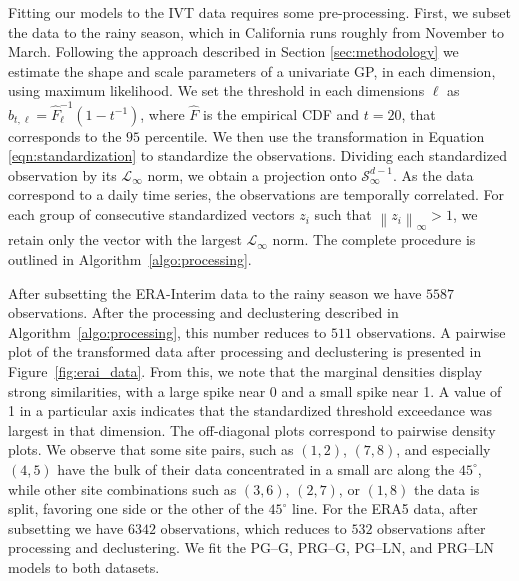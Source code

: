 \documentclass[iicol,sn-basic]{sn-jnl}
\newcommand{\norm}[1]{\left\lVert #1 \right\rVert}
\newcommand{\inorm}[1]{\norm{#1}_{\infty}}
\theoremstyle{thmstyleone}
\begin{document}
Fitting our models to the IVT data requires some pre-processing. First, we subset the data to the rainy season, which in California runs roughly from November to March.  Following the approach described in Section \ref{sec:methodology} we estimate the shape and scale parameters of a univariate GP, in each dimension, using maximum likelihood. We set the threshold in each dimensions $\ell$ as $b_{t,\ell} = \hat{F}_{\ell}^{-1}(1 - t^{-1})$, where $\hat{F}$ is the empirical CDF and $t=20$, that corresponds to the $95$ percentile. We then use the transformation in Equation \eqref{eqn:standardization} to standardize the observations.  Dividing each standardized observation by its $\mathcal{L}_{\infty}$ norm, we obtain a projection onto $\mathcal{S}_{\infty}^{d-1}$. As the data correspond to a daily time series, the observations are temporally correlated.  For each group of consecutive standardized vectors $z_i$ such  that  $\inorm{z_i} > 1$, we retain only the vector with the largest $\mathcal{L}_{\infty}$ norm.  The complete procedure is outlined in Algorithm~\ref{algo:processing}.

After subsetting the ERA-Interim data to the rainy season we have $5587$ observations. After the processing and declustering described in Algorithm~\ref{algo:processing}, this number reduces to $511$ observations. A pairwise plot of the transformed data after processing and declustering is presented in Figure~\ref{fig:erai_data}.  From this, we note that the marginal densities display strong similarities, with a large spike near 0 and a small spike near 1. A value of 1 in a particular axis indicates that the standardized threshold exceedance was largest in that dimension.  The off-diagonal plots correspond to pairwise density plots.  We observe that some site pairs, such as $(1,2)$, $(7,8)$, and especially $(4,5)$ have the bulk of their data concentrated in a small arc along the $45^{\circ}$, while other site combinations such as $(3,6)$, $(2,7)$, or $(1,8)$ the data is split, favoring one side or the other of the $45^{\circ}$ line. For the ERA5 data, after subsetting we have $6342$ observations, which reduces to $532$ observations after processing and declustering. We fit the PG--G, PRG--G, PG--LN, and PRG--LN models to both datasets.
\end{document}
